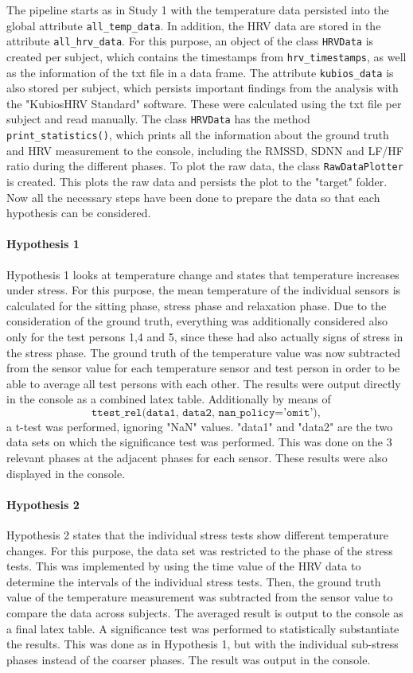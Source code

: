 The pipeline starts as in Study 1 with the temperature data persisted into the global attribute \texttt{all\_temp\_data}.
In addition, the HRV data are stored in the attribute \texttt{all\_hrv\_data}.
For this purpose, an object of the class \texttt{HRVData} is created per subject, which contains the timestamps from \texttt{hrv\_timestamps}, as well as the information of the txt file in a data frame.
The attribute \texttt{kubios\_data} is also stored per subject, which persists important findings from the analysis with the "KubiosHRV Standard" software.
These were calculated using the txt file per subject and read manually.
The class \texttt{HRVData} has the method \texttt{print\_statistics()}, which prints all the information about the ground truth and HRV measurement to the console, including the RMSSD, SDNN and LF/HF ratio during the different phases.
To plot the raw data, the class \texttt{RawDataPlotter} is created.
This plots the raw data and persists the plot to the "target" folder.
Now all the necessary steps have been done to prepare the data so that each hypothesis can be considered. 

\paragraph{Hypothesis 1}
Hypothesis 1 looks at temperature change and states that temperature increases under stress.
For this purpose, the mean temperature of the individual sensors is calculated for the sitting phase, stress phase and relaxation phase. 
Due to the consideration of the ground truth, everything was additionally considered also only for the test persons 1,4 and 5, since these had also actually signs of stress in the stress phase.
The ground truth of the temperature value was now subtracted from the sensor value for each temperature sensor and test person in order to be able to average all test persons with each other.
The results were output directly in the console as a combined latex table.
Additionally by means of 
\[
    \texttt{ttest\_rel(data1, data2, nan\_policy='omit')},
\]
a t-test was performed, ignoring "NaN" values. 
"data1" and "data2" are the two data sets on which the significance test was performed. 
This was done on the 3 relevant phases at the adjacent phases for each sensor. 
These results were also displayed in the console.

\paragraph{Hypothesis 2}
Hypothesis 2 states that the individual stress tests show different temperature changes.
For this purpose, the data set was restricted to the phase of the stress tests. 
This was implemented by using the time value of the HRV data to determine the intervals of the individual stress tests.
Then, the ground truth value of the temperature measurement was subtracted from the sensor value to compare the data across subjects. 
The averaged result is output to the console as a final latex table.
A significance test was performed to statistically substantiate the results.
This was done as in Hypothesis 1, but with the individual sub-stress phases instead of the coarser phases.
The result was output in the console.